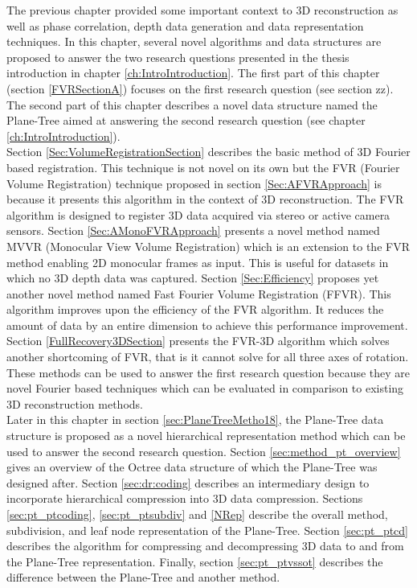 
The previous chapter provided some important context to 3D reconstruction as well as phase correlation, depth data generation and data representation techniques. In this chapter, several novel algorithms and data structures are proposed to answer the two research questions presented in the thesis introduction in chapter \ref{ch:IntroIntroduction}. The first part of this chapter (section \ref{FVRSectionA}) focuses on the first research question (see section zz). The second part of this chapter describes a novel data structure named the Plane-Tree aimed at answering the second research question (see chapter \ref{ch:IntroIntroduction}). \\

Section \ref{Sec:VolumeRegistrationSection} describes the basic method of 3D Fourier based registration. This technique is not novel on its own but the FVR (Fourier Volume Registration) technique proposed in section \ref{Sec:AFVRApproach} is because it presents this algorithm in the context of 3D reconstruction. The FVR algorithm is designed to register 3D data acquired via stereo or active camera sensors. Section \ref{Sec:AMonoFVRApproach} presents a novel method named MVVR (Monocular View Volume Registration) which is an  extension to the FVR method enabling 2D monocular frames as input. This is useful for datasets in which no 3D depth data was captured. Section \ref{Sec:Efficiency} proposes yet another novel method named Fast Fourier Volume Registration (FFVR). This algorithm improves upon the efficiency of the FVR algorithm. It reduces the amount of data by an entire dimension to achieve this performance improvement. Section \ref{FullRecovery3DSection} presents the FVR-3D algorithm which solves another shortcoming of FVR, that is it cannot solve for all three axes of rotation. These methods can be used to answer the first research question because they are novel Fourier based techniques which can be evaluated in comparison to existing 3D reconstruction methods. \\

Later in this chapter in section \ref{sec:PlaneTreeMetho18}, the Plane-Tree data structure is proposed as a novel hierarchical representation method which can be used to answer the second  research question. Section \ref{sec:method_pt_overview} gives an overview of the Octree data structure of which the Plane-Tree was designed after. Section \ref{sec:dr:coding} describes an intermediary design to incorporate hierarchical compression into 3D data compression. Sections \ref{sec:pt_ptcoding}, \ref{sec:pt_ptsubdiv} and \ref{NRep} describe the overall method, subdivision, and leaf node representation of the Plane-Tree. Section \ref{sec:pt_ptcd} describes the algorithm for compressing and decompressing 3D data to and from the Plane-Tree representation. Finally, section \ref{sec:pt_ptvssot} describes the difference between the Plane-Tree and another method. \\
